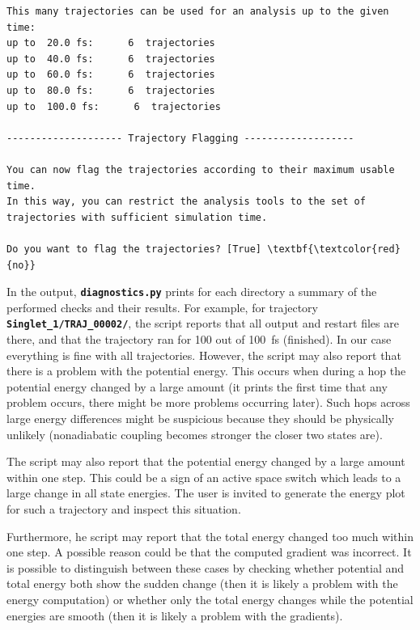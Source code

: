 \documentclass[a4paper,11pt,DIV=15,openany]{scrbook}
\newcommand{\ttt}[1]{\textbf{\texttt{#1}}}
\begin{document}
\begin{oframed}
\begin{Verbatim}[commandchars=\\\{\}]
This many trajectories can be used for an analysis up to the given time:
up to  20.0 fs:      6  trajectories
up to  40.0 fs:      6  trajectories
up to  60.0 fs:      6  trajectories
up to  80.0 fs:      6  trajectories
up to  100.0 fs:      6  trajectories

-------------------- Trajectory Flagging -------------------

You can now flag the trajectories according to their maximum usable time.
In this way, you can restrict the analysis tools to the set of trajectories with sufficient simulation time.

Do you want to flag the trajectories? [True] \textbf{\textcolor{red}{no}}

\end{Verbatim}
\end{oframed}

\normalsize

In the output, \ttt{diagnostics.py} prints for each directory a summary of the performed checks and their results.
For example, for trajectory \ttt{Singlet\_1/TRAJ\_00002/}, the script reports that all output and restart files are there, and that the trajectory ran for 100 out of 100~fs (finished). In our case everything is fine with all trajectories.
However, the script may also report that there is a problem with the potential energy.
This occurs when during a hop the potential energy changed by a large amount (it prints the first time that any problem occurs, there might be more problems occurring later).
Such hops across large energy differences might be suspicious because they should be physically unlikely (nonadiabatic coupling becomes stronger the closer two states are).

The script may also report that the potential energy changed by a large amount within one step.
This could be a sign of an active space switch which leads to a large change in all state energies.
The user is invited to generate the energy plot for such a trajectory and inspect this situation.

Furthermore, he script may report that the total energy changed too much within one step.
A possible reason could be that the computed gradient was incorrect.
It is possible to distinguish between these cases by checking whether potential and total energy both show the sudden change (then it is likely a problem with the energy computation) or whether only the total energy changes while the potential energies are smooth (then it is likely a problem with the gradients).
\end{document}
